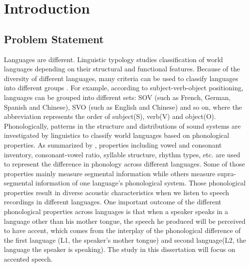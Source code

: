 \chapter{Introduction}
\label{introduction}

\section{Problem Statement}
Languages are different. Linguistic typology studies classification of world languages depending on their structural and functional features. Because of the diversity of different languages, many criteria can be used to classify languages into different groups \citep{wals}. For example, according to subject-verb-object positioning, languages can be grouped into different sets: SOV (such as French, German, Spanish and Chinese), SVO (such as English and Chinese) and so on, where the abbreviation represents the order of subject(S), verb(V) and object(O). Phonologically, patterns in the structure and distributions of sound systems are investigated by linguistics to classify world languages based on phonological properties. As summarized by \citep{wals}, properties including vowel and consonant inventory, consonant-vowel ratio, syllable structure, rhythm types, etc. are used to represent the difference in phonology across different languages. Some of those properties mainly measure segmental information while others measure supra-segmental information of one language's phonological system. Those phonological properties result in diverse acoustic characteristics when we listen to speech recordings in different languages. One important outcome of the different phonological properties across languages is that when a speaker speaks in a language other than his mother tongue, the speech he produced will be perceived to have accent, which comes from the interplay of the phonological difference of the first language (L1, the speaker's mother tongue) and second language(L2, the language the speaker is speaking). The study in this dissertation will focus on accented speech.

